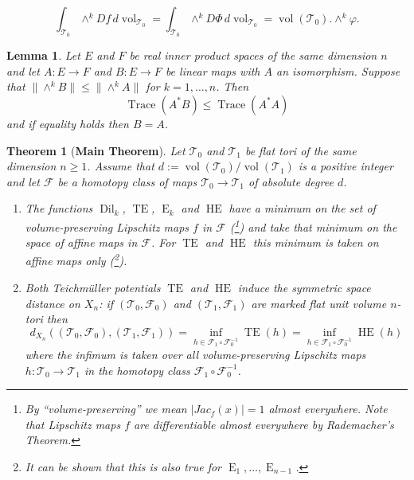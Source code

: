 \documentclass[10pt,a4paper]{amsart}
\newtheorem{theorem}{Theorem}
\newtheorem{lemma}{Lemma}
\newcommand{\Dil}{\operatorname{Dil}}
\DeclareMathOperator{\En}{E}
\newcommand{\Fc}{\mathcal{F}}
\DeclareMathOperator{\HE}{HE}
\DeclareMathOperator{\TE}{TE}
\newcommand{\Tc}{\mathcal{T}}
\DeclareMathOperator{\tr}{Trace}
\newcommand{\vol}{\operatorname{vol}}
\begin{document}
\begin{equation}\label{eqn:average}
\textstyle \int_{\Tc_0} \wedge^k Df\,d\!\vol_{\Tc_0}=\int_{\Tc_0} \wedge^k D\Phi\,d\!\vol_{\Tc_0}=\vol(\Tc_0).\wedge^k\varphi .
\end{equation}

\begin{lemma}\label{lemma:linalg}
Let $E$ and $F$ be real inner product  spaces of the same dimension $n$ and let $A: E\to F$ and $B: E\to F$ be linear maps with $A$ an isomorphism.  Suppose 
that $\|\wedge^k B\|\le  \|\wedge^kA\|$ for $k=1, \dots, n$. Then 
\[\tr(A^*B) \le \tr(A^*A)\] 
and if equality holds then $B=A$.
\end{lemma}

\begin{theorem}[{\bf Main Theorem}]
\label{theorem:newmain}
Let $\Tc_0$ and $\Tc_1$ be flat tori  of the same dimension $n\ge 1$. 
 Assume  that $d:=\vol(\Tc_0)/\vol(\Tc_1)$ is a positive integer and let $\Fc$ be a homotopy class of maps $\Tc_0\to \Tc_1$ of absolute degree $d$.  
 \medskip
 
\begin{enumerate}
\item The functions  $\Dil_k$, $\TE$, $\En_k$ and $\HE$   have a minimum  on the set  of  \emph{volume-preserving} Lipschitz 
maps  $f$ in $\Fc$  (\footnote{By ``volume-preserving'' we mean $|Jac_f(x)|=1$ 
almost everywhere.  Note that Lipschitz maps $f$ are differentiable almost everywhere by Rademacher's Theorem.}) and take that  minimum on the space of affine maps  in $\Fc$. For $\TE$ and $\HE$ this minimum is taken on affine maps \emph{only} (\footnote{It can be shown that this is also true for  $\En_1, \dots, \En_{n-1}$.}).
\bigskip

\item[(2)] Both Teichm\"uller potentials $\TE$ and $\HE$  induce the symmetric space 
distance on $X_n$:  if  $(\Tc_0,\Fc_0)$ and $(\Tc_1,\Fc_1)$ are marked flat unit volume $n$-tori
then 
\begin{equation}\label{eqn:TEmin}
\textstyle d_{X_n}((\Tc_0,\Fc_0),(\Tc_1,\Fc_1))=\inf_{h\in \Fc_1\circ \Fc_0^{-1}}\TE(h)=\inf_{h\in \Fc_1\circ \Fc_0^{-1}}\HE(h)
\end{equation}
where the infimum is taken over all volume-preserving Lipschitz maps $h:\Tc_0\to \Tc_1$ in the homotopy class $\Fc_1\circ \Fc_0^{-1}$.
\end{enumerate}
\end{theorem}
\end{document}
